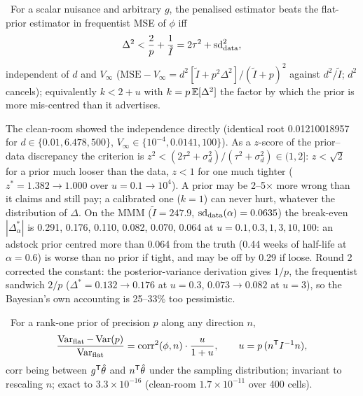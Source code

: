 \begin{law}
\label{ident:law:admissible}
\tagEstablished\ For a scalar nuisance and arbitrary $g$, the penalised estimator beats the flat-prior estimator in frequentist MSE of $\phi$ iff
\begin{equation}
\Delta^2 < \frac{2}{p} + \frac{1}{\tilde I} = 2\tau^2 + \mathrm{sd}_{\rm data}^2,
\label{ident:eq:admissible}
\end{equation}
independent of $d$ and $V_\infty$ ($\mathrm{MSE} - V_\infty = d^2[\tilde I + p^2\Delta^2]/(\tilde I + p)^2$ against $d^2/\tilde I$; $d^2$ cancels); equivalently $k < 2 + u$ with $k = p\,\mathbb{E}[\Delta^2]$ the factor by which the prior is more mis-centred than it advertises.
\end{law}

The clean-room showed the independence directly (identical root 0.01210018957 for $d \in \{0.01, 6.478, 500\}$, $V_\infty \in \{10^{-4}, 0.0141, 100\}$). As a $z$-score of the prior--data discrepancy the criterion is $z^2 < (2\tau^2 + \sigma_d^2)/(\tau^2 + \sigma_d^2) \in (1, 2]$: $z < \sqrt2$ for a prior much looser than the data, $z < 1$ for one much tighter ($z^* = 1.382 \to 1.000$ over $u = 0.1 \to 10^4$). A prior may be 2--5$\times$ more wrong than it claims and still pay; a calibrated one ($k = 1$) can never hurt, whatever the distribution of $\Delta$. On the MMM ($\tilde I = 247.9$, $\mathrm{sd}_{\rm data}(\alpha) = 0.0635$) the break-even $|\Delta_\alpha^*|$ is 0.291, 0.176, 0.110, 0.082, 0.070, 0.064 at $u = 0.1, 0.3, 1, 3, 10, 100$: an adstock prior centred more than 0.064 from the truth (0.44 weeks of half-life at $\alpha = 0.6$) is worse than no prior if tight, and may be off by 0.29 if loose. Round 2 corrected the constant: the posterior-variance derivation gives $1/p$, the frequentist sandwich $2/p$ ($\Delta^* = 0.132 \to 0.176$ at $u = 0.3$, $0.073 \to 0.082$ at $u = 3$), so the Bayesian's own accounting is 25--33\% too pessimistic.

\begin{law}
\label{ident:law:direction}
\tagEstablished\ For a rank-one prior of precision $p$ along any direction $n$,
\begin{equation}
\frac{\operatorname{Var}_{\rm flat} - \operatorname{Var}(p)}{\operatorname{Var}_{\rm flat}} = \mathrm{corr}^2(\phi, n)\cdot\frac{u}{1 + u}, \qquad u = p\,(n^{\mathsf{T}} I^{-1}n),
\label{ident:eq:direction}
\end{equation}
corr being between $g^{\mathsf{T}}\hat\theta$ and $n^{\mathsf{T}}\hat\theta$ under the sampling distribution; invariant to rescaling $n$; exact to $3.3\times10^{-16}$ (clean-room $1.7\times10^{-11}$ over 400 cells).
\end{law}


